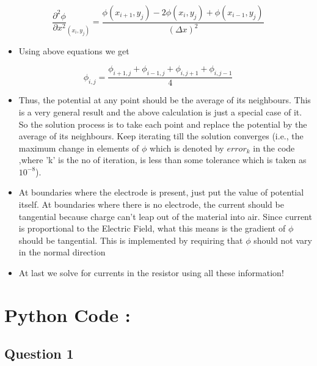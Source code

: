 \documentclass[11pt, a4paper]{article}
\begin{document}
    \begin{equation}
    \frac{\partial^{2} \phi}{\partial x^{2}}_{(x_i,y_j)} = \frac{\phi(x_{i+1},y_j) -2\phi(x_i,y_j)+ \phi(x_{i-1},y_j)}{(\Delta x)^{2}}
     \end{equation}
    
    \begin{itemize}
    \item
      Using above equations we get
    \end{itemize}
    
    \begin{equation}
            \phi_{i,j} = \frac{\phi_{i+1,j} + \phi_{i-1,j} + \phi_{i,j+1} + \phi_{i,j-1}}{4} 
    \end{equation}
    
    \begin{itemize}
    \item
      Thus, the potential at any point should be the average of its
      neighbours. This is a very general result and the above calculation is
      just a special case of it. So the solution process is to take each
      point and replace the potential by the average of its neighbours. Keep
      iterating till the solution converges (i.e., the maximum change in
      elements of \(\phi\) which is denoted by \(error_k\) in the code
      ,where 'k' is the no of iteration, is less than some tolerance which
      is taken as \(10^{-8}\)).
    \item
      At boundaries where the electrode is present, just put the value of
      potential itself. At boundaries where there is no electrode, the
      current should be tangential because charge can't leap out of the
      material into air. Since current is proportional to the Electric
      Field, what this means is the gradient of \(\phi\) should be
      tangential. This is implemented by requiring that \(\phi\) should not
      vary in the normal direction
    \item
      At last we solve for currents in the resistor using all these
      information!
  \end{itemize}

  \section{Python Code :}\label{python-code}
  \subsection{Question 1}\label{question-1}
\end{document}
